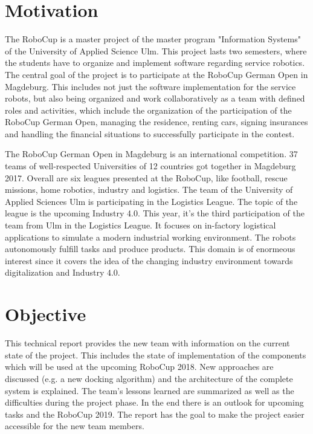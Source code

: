 \section{Motivation}

The RoboCup is a master project of the master program "Information Systems" of the University of Applied Science Ulm. This project lasts two semesters, where the students have to organize and implement software regarding service robotics. The central goal of the project is to participate at the RoboCup German Open in Magdeburg. This includes not just the software implementation for the service robots, but also being organized and work collaboratively as a team with defined roles and activities, which include the organization of the participation of the RoboCup German Open, managing the residence, renting cars, signing insurances and handling the financial situations to successfully participate in the contest. 

The RoboCup German Open in Magdeburg is an international competition. 37 teams of well-respected Universities of 12 countries got together in Magdeburg 2017. Overall are six leagues presented at the RoboCup, like football, rescue missions, home robotics, industry and logistics. The team of the University of Applied Sciences Ulm is participating in the Logistics League. The topic of the league is the upcoming Industry 4.0. This year, it's the third participation of the team from Ulm in the Logistics League. It focuses on in-factory logistical applications to simulate a modern industrial working environment. The robots autonomously fulfill tasks and produce products. This domain is of enormeous interest since it covers the idea of the changing industry environment towards digitalization and Industry 4.0. 

\section{Objective}

This technical report provides the new team with information on the current state of the project. This includes the state of implementation of the components which will be used at the upcoming RoboCup 2018. New approaches are discussed (e.g. a new docking algorithm) and the architecture of the complete system is explained. The team's lessons learned are summarized as well as the difficulties during the project phase. In the end there is an outlook for upcoming tasks and the RoboCup 2019.
The report has the goal to make the project easier accessible for the new team members.  
